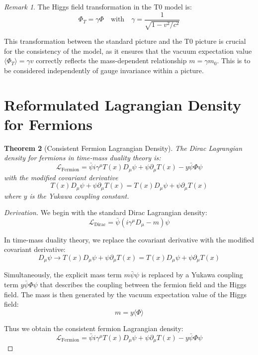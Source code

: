 \documentclass{article}
\newtheorem{theorem}{Theorem}[section]
\theoremstyle{definition}
\theoremstyle{remark}
\newtheorem{remark}[theorem]{Remark}
\newcommand{\Tfield}{T(x)} %
\newcommand{\DcovT}[1]{\Tfield D_\mu #1 + #1 \partial_\mu \Tfield}
\begin{document}
	\begin{remark}
		The Higgs field transformation in the T0 model is:
		\begin{equation}
			\Phi_T = \gamma \Phi \quad \text{with} \quad \gamma = \frac{1}{\sqrt{1-v^2/c^2}}
		\end{equation}
		
		This transformation between the standard picture and the T0 picture is crucial for the consistency of the model, as it ensures that the vacuum expectation value $\langle \Phi_T \rangle = \gamma v$ correctly reflects the mass-dependent relationship $m = \gamma m_0$. This is to be considered independently of gauge invariance within a picture.
	\end{remark}
	
	\section{Reformulated Lagrangian Density for Fermions}
	
	\begin{theorem}[Consistent Fermion Lagrangian Density]
		The Dirac Lagrangian density for fermions in time-mass duality theory is:
		\begin{equation}
			\mathcal{L}_{\text{Fermion}} = \bar{\psi}i\gamma^\mu \DcovT{\psi} - y\bar{\psi}\Phi\psi
		\end{equation}
		with the modified covariant derivative
		\begin{equation}
			\DcovT{\psi} = \Tfield D_\mu \psi + \psi \partial_\mu \Tfield
		\end{equation}
		where $y$ is the Yukawa coupling constant.
	\end{theorem}
	
	\begin{proof}[Derivation]
		We begin with the standard Dirac Lagrangian density:
		\begin{equation}
			\mathcal{L}_{\text{Dirac}} = \bar{\psi}(i\gamma^\mu D_\mu - m)\psi
		\end{equation}
		
		In time-mass duality theory, we replace the covariant derivative with the modified covariant derivative:
		\begin{equation}
			D_\mu \psi \rightarrow \DcovT{\psi} = \Tfield D_\mu \psi + \psi \partial_\mu \Tfield
		\end{equation}
		
		Simultaneously, the explicit mass term $m\bar{\psi}\psi$ is replaced by a Yukawa coupling term $y\bar{\psi}\Phi\psi$ that describes the coupling between the fermion field and the Higgs field. The mass is then generated by the vacuum expectation value of the Higgs field:
		\begin{equation}
			m = y\langle\Phi\rangle
		\end{equation}
		
		Thus we obtain the consistent fermion Lagrangian density:
		\begin{equation}
			\mathcal{L}_{\text{Fermion}} = \bar{\psi}i\gamma^\mu \DcovT{\psi} - y\bar{\psi}\Phi\psi
		\end{equation}
	\end{proof}
	
\end{document}
